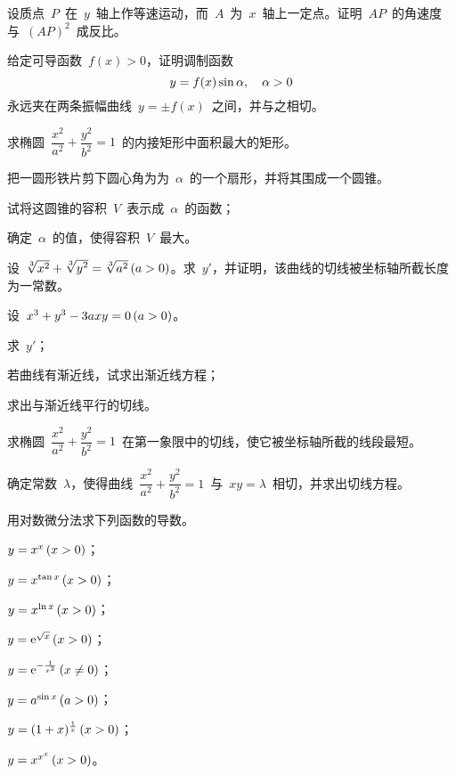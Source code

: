 \begin{exercise}
\item 设质点~$P$~在~$y$~轴上作等速运动，而~$A$~为~$x$~轴上一定点。证明~$AP$~的角速度与~$(AP)^2$~成反比。
\item 给定可导函数~$f(x)>0$，证明调制函数
\[
  y=f(x)\sin\alpha\mcond*{\alpha>0}
\]
永远夹在两条振幅曲线~$y=\pm f(x)$~之间，并与之相切。
\item 求椭圆~$\dfrac{x^2}{a^2}+\dfrac{y^2}{b^2}=1$~的内接矩形中面积最大的矩形。
\item 把一圆形铁片剪下圆心角为为~$\alpha$~的一个扇形，并将其围成一个圆锥。
\begin{exlistcols}
  \item 试将这圆锥的容积~$V$~表示成~$\alpha$~的函数；
  \item 确定~$\alpha$~的值，使得容积~$V$~最大。
\end{exlistcols}
\item 设~$\sqrt[3]{x^2}+\smbsqrt[3]{y^2}=\sqrt[3]{a^2}\mcond{a>0}$。求~$y'$，并证明，该曲线的切线被坐标轴所截长度为一常数。
\item 设~$x^3+y^3-3axy=0\mcond{a>0}$。
\begin{exlistcols}
  \item 求~$y'$；
  \item 若曲线有渐近线，试求出渐近线方程；
  \item 求出与渐近线平行的切线。
\end{exlistcols}
\item 求椭圆~$\dfrac{x^2}{a^2}+\dfrac{y^2}{b^2}=1$~在第一象限中的切线，使它被坐标轴所截的线段最短。
\item 确定常数~$\lambda$，使得曲线~$\dfrac{x^2}{a^2}+\dfrac{y^2}{b^2}=1$~与~$xy=\lambda$~相切，并求出切线方程。
\item 用对数微分法求下列函数的导数。
\begin{exlistcols}[3]
  \item $y=x^x\mcond{x>0}$；
  \item $y=x^{\tan x}\mcond{x>0}$；
  \item $y=x^{\ln x}\mcond{x>0}$；
  \item $y=\me^{\sqrt x}\mcond{x>0}$；
  \item $y=\me^{-\frac1{x^2}}\mcond{x\neq0}$；
  \item $y=a^{\sin x}\mcond{a>0}$；
  \item $y=(1+x)^{\frac1x}\mcond{x>0}$；
  \item $y=x^{x^x}\mcond{x>0}$。
\end{exlistcols}
\end{exercise}

